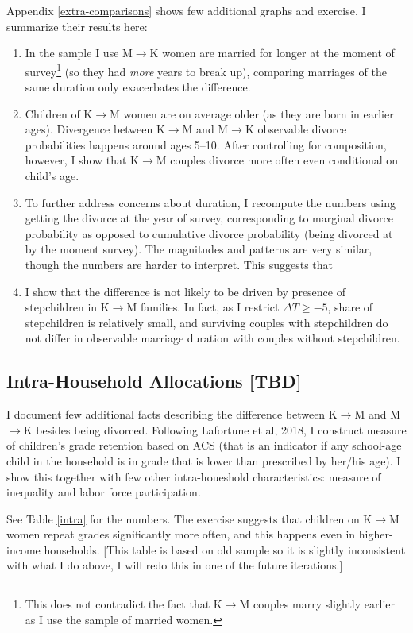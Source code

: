 \documentclass[12pt,letter]{article}
\begin{document}
Appendix \ref{extra-comparisons} shows few additional graphs and exercise. I summarize their results here:
\begin{enumerate}
\item In the sample I use M$\to$K women are married for longer at the moment of survey\footnote{This does not contradict the fact that K$\to$M couples marry slightly earlier as I use the sample of married women.} (so they had \emph{more} years to break up), comparing marriages of the same duration only exacerbates the difference.
\item Children of K$\to$M women are on average older (as they are born in earlier ages). Divergence between K$\to$M and M$\to$K observable divorce probabilities happens around ages 5--10. After controlling for composition, however, I show that K$\to$M couples divorce more often even conditional on child's age.
\item To further address concerns about duration, I recompute the numbers using getting the divorce at the year of survey, corresponding to marginal divorce probability as opposed to cumulative divorce probability (being divorced at by the moment survey). The magnitudes and patterns are very similar, though the numbers are harder to interpret. This suggests that 
\item I show that the difference is not likely to be driven by presence of stepchildren in K$\to$M families. In fact, as I restrict $\Delta T \geq -5$, share of stepchildren is relatively small, and surviving couples with stepchildren do not differ in observable marriage duration with couples without stepchildren.
\end{enumerate}

\subsection{Intra-Household Allocations [TBD]}
I document few additional facts describing the difference between K$\to$M and M$\to$K besides being divorced. Following Lafortune et al, 2018, I construct measure of children's grade retention based on ACS (that is an indicator if any school-age child in the household is in grade that is lower than prescribed by her/his age). I show this together with few other intra-houeshold characteristics: measure of inequality and labor force participation. 

See Table \ref{intra} for the numbers. The exercise suggests that children on K$\to$M women repeat grades significantly more often, and this happens even in higher-income households. [This table is based on old sample so it is slightly inconsistent with what I do above, I will redo this in one of the future iterations.] 
\end{document}
